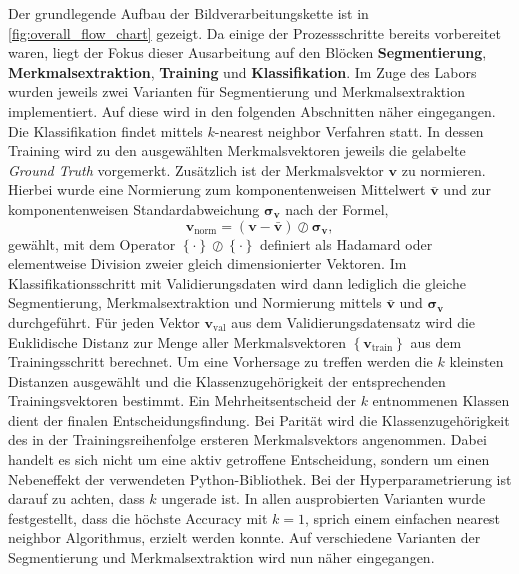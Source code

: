 Der grundlegende Aufbau der Bildverarbeitungskette ist in \cref{fig:overall_flow_chart} gezeigt. Da einige der Prozessschritte bereits vorbereitet waren, liegt der Fokus dieser Ausarbeitung auf den Blöcken \textbf{Segmentierung}, \textbf{Merkmalsextraktion}, \textbf{Training} und \textbf{Klassifikation}. Im Zuge des Labors wurden jeweils zwei Varianten für Segmentierung und Merkmalsextraktion implementiert. Auf diese wird in den folgenden Abschnitten näher eingegangen. Die Klassifikation findet mittels \foreignlanguage{english}{\(k\)-nearest neighbor} Verfahren statt. In dessen Training wird zu den ausgewählten Merkmalsvektoren jeweils die gelabelte \foreignlanguage{english}{\emph{Ground Truth}} vorgemerkt. Zusätzlich ist der Merkmalsvektor \(\boldsymbol{v}\) zu normieren. Hierbei wurde eine Normierung zum komponentenweisen Mittelwert \(\bar{\boldsymbol{v}}\) und zur komponentenweisen Standardabweichung \(\boldsymbol{\sigma}_{\boldsymbol{v}}\) nach der Formel,
%
\begin{equation*}
    \boldsymbol{v}_{\mathrm{norm}} = {\left( \boldsymbol{v} - \bar{\boldsymbol{v}} \right)} \oslash \boldsymbol{\sigma}_{\boldsymbol{v}} {,}
\end{equation*}
%
gewählt, mit dem Operator \({\left \{\cdot \right \}} \oslash {\left \{\cdot \right \}}\) definiert als Hadamard oder elementweise Division zweier gleich dimensionierter Vektoren. Im Klassifikationsschritt mit Validierungsdaten wird dann lediglich die gleiche Segmentierung, Merkmalsextraktion und Normierung mittels \(\bar{\boldsymbol{v}}\) und \(\boldsymbol{\sigma}_{\boldsymbol{v}}\) durchgeführt. Für jeden Vektor \(\boldsymbol{v}_{\mathrm{val}}\) aus dem Validierungsdatensatz wird die Euklidische Distanz zur Menge aller Merkmalsvektoren \({\left \{ \boldsymbol{v}_{\mathrm{train} } \right \}}\) aus dem Trainingsschritt berechnet. Um eine Vorhersage zu treffen werden die \(k\) kleinsten Distanzen ausgewählt und die Klassenzugehörigkeit der entsprechenden Trainingsvektoren bestimmt. Ein Mehrheitsentscheid der \(k\) entnommenen Klassen dient der finalen Entscheidungsfindung. Bei Parität wird die Klassenzugehörigkeit des in der Trainingsreihenfolge ersteren Merkmalsvektors angenommen. Dabei handelt es sich nicht um eine aktiv getroffene Entscheidung, sondern um einen Nebeneffekt der verwendeten Python-Bibliothek. Bei der Hyperparametrierung ist darauf zu achten, dass \(k\) ungerade ist. In allen ausprobierten Varianten wurde festgestellt, dass die höchste \foreignlanguage{english}{Accuracy} mit \(k = 1\), sprich einem einfachen \foreignlanguage{english}{nearest neighbor} Algorithmus, erzielt werden konnte. Auf verschiedene Varianten der Segmentierung und Merkmalsextraktion wird nun näher eingegangen.

